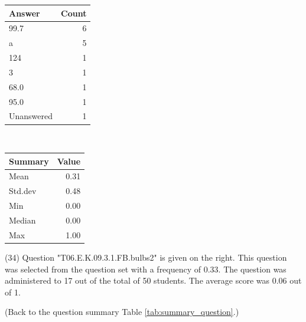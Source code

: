 \documentclass[12pt,english,nohyper]{tufte-handout}\usepackage[]{graphicx}\usepackage[]{color}
\begin{document}
\begin{center}%
\begin{tabular}{lr}
  \hline
Answer & Count \\ 
  \hline
99.7 &   6 \\ 
  a &   5 \\ 
  124 &   1 \\ 
  3 &   1 \\ 
  68.0 &   1 \\ 
  95.0 &   1 \\ 
  Unanswered &   1 \\ 
   \hline
\end{tabular}
~~~~~~~~%
\begin{tabular}{lr}
  \hline
Summary & Value \\ 
  \hline
Mean & 0.31 \\ 
  Std.dev & 0.48 \\ 
  Min & 0.00 \\ 
  Median & 0.00 \\ 
  Max & 1.00 \\ 
   \hline
\end{tabular}
\end{center}\newpage{} (34) Question "T06.E.K.09.3.1.FB.bulbs2" is given on the right. This question was selected from the question set with a frequency of 0.33. The question was administered to 17 out of the total of 50 students. The average score was 0.06 out of 1.

 (Back to the question summary Table \ref{tab:summary_question}.)
\end{document}
